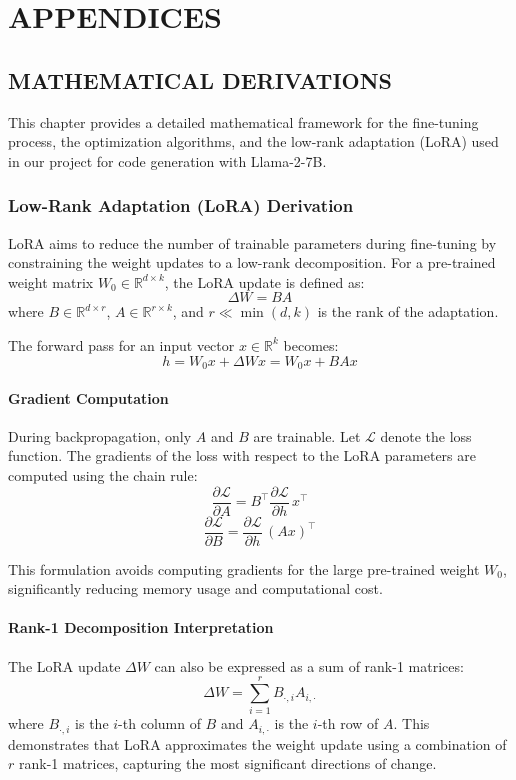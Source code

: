 \chapter{APPENDICES}
\appendix
\section{MATHEMATICAL DERIVATIONS}
This chapter provides a detailed mathematical framework for the fine-tuning process, the optimization algorithms, and the low-rank adaptation (LoRA) used in our project for code generation with Llama-2-7B.

\subsection{Low-Rank Adaptation (LoRA) Derivation}
LoRA aims to reduce the number of trainable parameters during fine-tuning by constraining the weight updates to a low-rank decomposition. For a pre-trained weight matrix $W_0 \in \mathbb{R}^{d \times k}$, the LoRA update is defined as:
\[
\Delta W = BA
\]
where 
$B \in \mathbb{R}^{d \times r}$, $A \in \mathbb{R}^{r \times k}$, and $r \ll \min(d,k)$ is the rank of the adaptation.  

The forward pass for an input vector $x \in \mathbb{R}^{k}$ becomes:
\[
h = W_0 x + \Delta W x = W_0 x + B A x
\]

\subsubsection{Gradient Computation}
During backpropagation, only $A$ and $B$ are trainable. Let $\mathcal{L}$ denote the loss function. The gradients of the loss with respect to the LoRA parameters are computed using the chain rule:
\[
\frac{\partial \mathcal{L}}{\partial A} = B^\top \frac{\partial \mathcal{L}}{\partial h} \, x^\top
\]
\[
\frac{\partial \mathcal{L}}{\partial B} = \frac{\partial \mathcal{L}}{\partial h} \, (A x)^\top
\]

This formulation avoids computing gradients for the large pre-trained weight $W_0$, significantly reducing memory usage and computational cost.

\subsubsection{Rank-1 Decomposition Interpretation}
The LoRA update $\Delta W$ can also be expressed as a sum of rank-1 matrices:
\[
\Delta W = \sum_{i=1}^{r} B_{\cdot,i} A_{i,\cdot}
\]
where $B_{\cdot,i}$ is the $i$-th column of $B$ and $A_{i,\cdot}$ is the $i$-th row of $A$. This demonstrates that LoRA approximates the weight update using a combination of $r$ rank-1 matrices, capturing the most significant directions of change.


